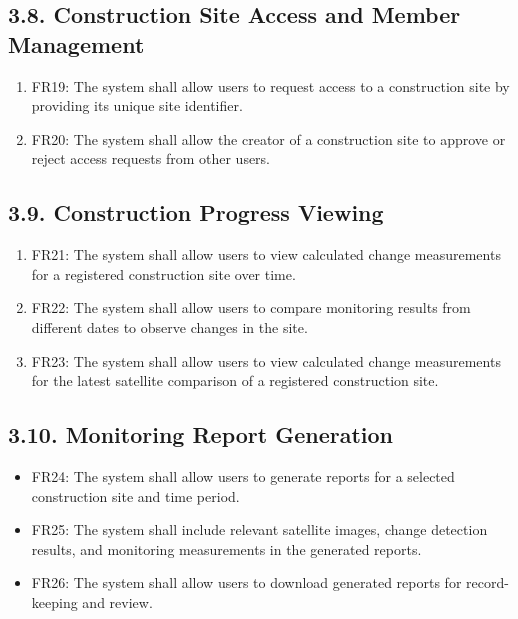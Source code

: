 \documentclass[12pt,a4paper]{report}
\begin{document}
\subsection{\texorpdfstring{ 3.8. Construction Site Access and Member
Management}{ 3.8. Construction Site Access and Member Management}}\label{construction-site-access-and-member-management}

\begin{enumerate}
\def\labelenumi{\arabic{enumi}.}
\item
  FR19: The system shall allow users to request access to a construction
  site by providing its unique site identifier.
\item
  FR20: The system shall allow the creator of a construction site to
  approve or reject access requests from other users.
\end{enumerate}

\subsection{3.9. Construction Progress
Viewing}\label{construction-progress-viewing}

\begin{enumerate}
\def\labelenumi{\arabic{enumi}.}
\item
  FR21: The system shall allow users to view calculated change
  measurements for a registered construction site over time.
\item
  FR22: The system shall allow users to compare monitoring results from
  different dates to observe changes in the site.
\item
  FR23: The system shall allow users to view calculated change
  measurements for the latest satellite comparison of a registered
  construction site.
\end{enumerate}

\subsection{3.10. Monitoring Report
Generation}\label{monitoring-report-generation}

\begin{itemize}
\item
  FR24: The system shall allow users to generate reports for a selected
  construction site and time period.
\item
  FR25: The system shall include relevant satellite images, change
  detection results, and monitoring measurements in the generated
  reports.
\item
  FR26: The system shall allow users to download generated reports for
  record-keeping and review.
\end{itemize}
\end{document}
